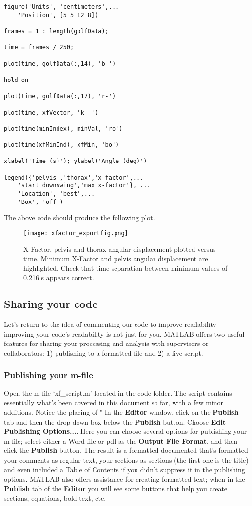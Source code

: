 \documentclass[12pt,a4paper]{article}
\begin{document}
\begin{lstlisting}[style=Matlab-editor]
% Plot data
figure('Units', 'centimeters',...
    'Position', [5 5 12 8])

frames = 1 : length(golfData);

time = frames / 250;

plot(time, golfData(:,14), 'b-')

hold on

plot(time, golfData(:,17), 'r-')

plot(time, xfVector, 'k--')

plot(time(minIndex), minVal, 'ro')

plot(time(xfMinInd), xfMin, 'bo')

xlabel('Time (s)'); ylabel('Angle (deg)')

legend({'pelvis','thorax','x-factor',...
    'start downswing','max x-factor'}, ...
    'Location', 'best',...
    'Box', 'off')
\end{lstlisting}
The above code should produce the following plot.
\begin{figure}[H]
\centering
\texttt{[image: xfactor\_exportfig.png]}
\caption{X-Factor, pelvis and thorax angular displacement plotted versus time. Minimum X-Factor and pelvis angular displacement are highlighted. Check that time separation between minimum values of 0.216 s appears correct.}
\label{xfactor}
\end{figure}

\subsection{Sharing your code}
Let's return to the idea of commenting our code to improve readability – improving your code's readability is not just for you.
MATLAB offers two useful features for sharing your processing and analysis with supervisors or collaborators: 1) publishing to a formatted file and 2) a live script.

\subsubsection{Publishing your m-file}
Open the m-file `xf\_script.m' located in the code folder.
The script contains essentially what's been covered in this document so far, with a few minor additions.
Notice the placing of "%
In the \textbf{Editor} window, click on the \textbf{Publish} tab and then the drop down box below the \textbf{Publish} button.
Choose \textbf{Edit Publishing Options...}.
Here you can choose several options for publishing your m-file; select either a Word file or pdf as the \textbf{Output File Format}, and then click the \textbf{Publish} button.
The result is a formatted documented that's formatted your comments as regular text, your sections as sections (the first one is the title) and even included a Table of Contents if you didn't suppress it in the publishing options.
MATLAB also offers assistance for creating formatted text; when in the \textbf{Publish} tab of the \textbf{Editor} you will see some buttons that help you create sections, equations, bold text, etc.
\end{document}
